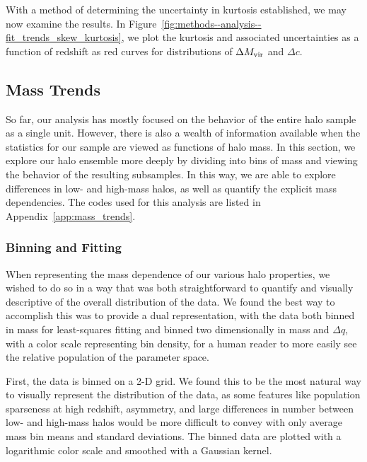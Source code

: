 With a method of determining the uncertainty in kurtosis established, we may now examine the results.  In Figure~\ref{fig:methods--analysis--fit_trends_skew_kurtosis}, we plot the kurtosis and associated uncertainties as a function of redshift as red curves for distributions of $\Delta {M_{\mathrm{vir}}}$ and $\Delta c$.




\subsection{Mass Trends}
\label{subsec:analysis--mass_trends}


So far, our analysis has mostly focused on the behavior of the entire halo sample as a single unit.  However, there is also a wealth of information available when the statistics for our sample are viewed as functions of halo mass.  In this section, we explore our halo ensemble more deeply by dividing into bins of mass and viewing the behavior of the resulting subsamples.  In this way, we are able to explore differences in low- and high-mass halos, as well as quantify the explicit mass dependencies.  The codes used for this analysis are listed in Appendix~\ref{app:mass_trends}.



\subsubsection{Binning and Fitting}
\label{subsubsec:analysis--mass_trends--binning_plotting}


When representing the mass dependence of our various halo properties, we wished to do so in a way that was both straightforward to quantify and visually descriptive of the overall distribution of the data.  We found the best way to accomplish this was to provide a dual representation, with the data both binned in mass for least-squares fitting and binned two dimensionally in mass and $\Delta q$, with a color scale representing bin density, for a human reader to more easily see the relative population of the parameter space.

First, the data is binned on a 2-D grid.  We found this to be the most natural way to visually represent the distribution of the data, as some features like population sparseness at high redshift, asymmetry, and large differences in number between low- and high-mass halos would be more difficult to convey with only average mass bin means and standard deviations.  The binned data are plotted with a logarithmic color scale and smoothed with a Gaussian kernel.


